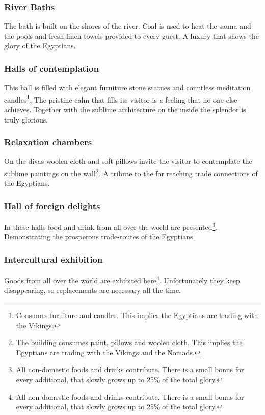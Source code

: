 \subsubsection{River Baths}
The bath is built on the shores of the river. Coal is used to heat the sauna
and the pools and fresh linen-towels provided to every guest. A luxury that
shows the glory of the \gls{Egyptians}.

\subsubsection{Halls of contemplation}
This hall is filled with elegant furniture stone statues and countless
meditation candles\footnote{ Consumes furniture and candles. This implies the
	\gls{Egyptians} are trading with the \gls{Vikings}. }. The pristine calm that
fills its visitor is a feeling that no one else achieves. Together with the
sublime architecture on the inside the splendor is truly glorious.

\subsubsection{Relaxation chambers}
On the divas woolen cloth and soft pillows invite the visitor to contemplate
the sublime paintings on the wall\footnote{ The building consumes paint,
	pillows and woolen cloth. This implies the \gls{Egyptians} are trading with the
	\gls{Vikings} and the \gls{Nomads}. }. A tribute to the far reaching trade
connections of the \gls{Egyptians}.

\subsubsection{Hall of foreign delights}
In these halls food and drink from all over the world are presented\footnote{
	All non-domestic foods and drinks contribute. There is a small bonus for every
	additional, that slowly grows up to 25\% of the total glory. }. Demonstrating
the prosperous trade-routes of the \gls{Egyptians}.

\subsubsection{Intercultural exhibition}
Goods from all over the world are exhibited here\footnote{ All non-domestic
	foods and drinks contribute. There is a small bonus for every additional, that
	slowly grows up to 25\% of the total glory. }. Unfortunately they keep
disappearing, so replacements are necessary all the time.


